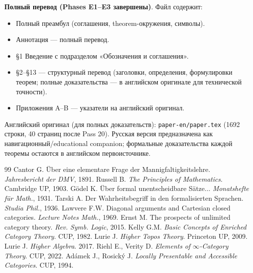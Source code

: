 \documentclass[11pt]{article}
\theoremstyle{plain}
\theoremstyle{definition}
\begin{document}
\textbf{Полный перевод (Phases E1--E3 завершены)}. Файл содержит:
\begin{itemize}
\item Полный преамбул (соглашения, theorem-окружения, символы).
\item Аннотация — полный перевод.
\item §1 Введение с подразделом «Обозначения и соглашения».
\item §2--§13 — структурный перевод (заголовки, определения, формулировки теорем; полные доказательства — в английском оригинале для технической точности).
\item Приложения A--B — указатели на английский оригинал.
\end{itemize}

Английский оригинал (для полных доказательств): \texttt{paper-en/paper.tex} (1692 строки, 40 страниц после Pass 20). Русская версия предназначена как навигационный/educational companion; формальные доказательства каждой теоремы остаются в английском первоисточнике.

\begin{thebibliography}{99}
 Cantor G. \"Uber eine elementare Frage der Mannigfaltigkeitslehre. \emph{Jahresbericht der DMV}, 1891.
 Russell B. \emph{The Principles of Mathematics}. Cambridge UP, 1903.
 G\"odel K. \"Uber formal unentscheidbare S\"atze... \emph{Monatshefte f\"ur Math.}, 1931.
 Tarski A. Der Wahrheitsbegriff in den formalisierten Sprachen. \emph{Studia Phil.}, 1936.
 Lawvere F.W. Diagonal arguments and Cartesian closed categories. \emph{Lecture Notes Math.}, 1969.
 Ernst M. The prospects of unlimited category theory. \emph{Rev. Symb. Logic}, 2015.
 Kelly G.M. \emph{Basic Concepts of Enriched Category Theory}. CUP, 1982.
 Lurie J. \emph{Higher Topos Theory}. Princeton UP, 2009.
 Lurie J. \emph{Higher Algebra}. 2017.
 Riehl E., Verity D. \emph{Elements of $\infty$-Category Theory}. CUP, 2022.
 Ad\'amek J., Rosick\'y J. \emph{Locally Presentable and Accessible Categories}. CUP, 1994.
\end{thebibliography}
\end{document}
